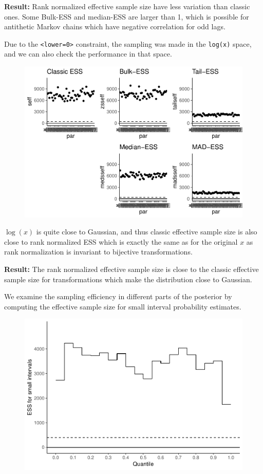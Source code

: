 \documentclass[american,]{article}
\begin{document}
\textbf{Result:} Rank normalized effective sample size have less
variation than classic ones. Some Bulk-ESS and median-ESS are larger
than 1, which is possible for antithetic Markov chains which have
negative correlation for odd lags.

Due to the \texttt{\textless{}lower=0\textgreater{}} constraint, the
sampling was made in the \texttt{log(x)} space, and we can also check
the performance in that space.

\begin{figure}[tp]
  \centering
  \includegraphics[width=0.6\linewidth]{graphics/ess-fit-half-nom-2-1.pdf}
\end{figure}

\(\log(x)\) is quite close to Gaussian, and thus classic effective
sample size is also close to rank normalized ESS which is exactly the
same as for the original \(x\) as rank normalization is invariant to
bijective transformations.

\textbf{Result:} The rank normalized effective sample size is close to
the classic effective sample size for transformations which make the
distribution close to Gaussian.

We examine the sampling efficiency in different parts of the posterior
by computing the effective sample size for small interval probability
estimates.

\begin{figure}[tp]
  \centering
  \includegraphics[width=0.6\linewidth]{graphics/local-ess-fit-half-nom-1.pdf}
\end{figure}
\end{document}

